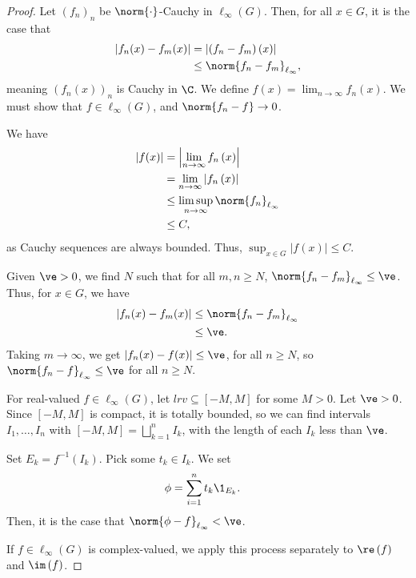 \begin{proof}
  Let $\left(f_n\right)_n$ be $\norm{\cdot}$-Cauchy in $\ell_{\infty}\left(G\right)$. Then, for all $x\in G$, it is the case that
  \begin{align*}
    \left\vert f_n(x) - f_m(x) \right\vert &= \left\vert \left(f_n - f_m\right)\left(x\right) \right\vert\\
                                           &\leq \norm{f_n - f_m}_{\ell_{\infty}},
  \end{align*}
  meaning $\left(f_n\left(x\right)\right)_n$ is Cauchy in $\C$. We define $f(x) = \lim_{n\rightarrow\infty}f_n(x)$. We must show that $f\in \ell_{\infty}\left(G\right)$, and $\norm{f_n-f}\rightarrow 0$.\newline

  We have
  \begin{align*}
    \left\vert f(x) \right\vert &= \left\vert \lim_{n\rightarrow\infty}f_n\left(x\right) \right\vert\\
                                &= \lim_{n\rightarrow\infty}\left\vert f_n\left(x\right) \right\vert\\
                                &\leq \limsup_{n\rightarrow\infty}\norm{f_n}_{\ell_{\infty}}\\
                                &\leq C,
  \end{align*}
  as Cauchy sequences are always bounded. Thus, $\sup_{x\in G}\left\vert f(x) \right\vert\leq C$.\newline

  Given $\ve > 0$, we find $N$ such that for all $m,n\geq N$, $\norm{f_n - f_m}_{\ell_{\infty}} \leq \ve$. Thus, for $x\in G$, we have
  \begin{align*}
    \left\vert f_n(x) - f_m(x) \right\vert &\leq \norm{f_n - f_m}_{\ell_{\infty}}\\
                                           &\leq \ve.
  \end{align*}
  Taking $m\rightarrow\infty$, we get $\left\vert f_n(x) - f(x) \right\vert \leq \ve$, for all $n\geq N$, so $\norm{f_n - f}_{\ell_{\infty}}\leq \ve$ for all $n\geq N$.\newline

  For real-valued $f\in \ell_{\infty}\left(G\right)$, let $lrv \subseteq \left[-M,M\right]$ for some $M > 0$. Let $\ve > 0$. Since $\left[-M,M\right]$ is compact, it is totally bounded, so we can find intervals $I_{1},\dots,I_n$ with $\left[-M,M\right] = \bigsqcup_{k=1}^{n}I_k$, with the length of each $I_k$ less than $\ve$.\newline

  Set $E_k = f^{-1}\left(I_k\right)$. Pick some $t_k\in I_k$. We set
  \begin{align*}
    \phi &= \sum_{i=1}^{n}t_k\1_{E_k}.
  \end{align*}
  Then, it is the case that $\norm{\phi - f}_{\ell_{\infty}} < \ve$.\newline

  If $f\in \ell_{\infty}(G)$ is complex-valued, we apply this process separately to $\re\left(f\right)$ and $\im\left(f\right)$.
\end{proof}
